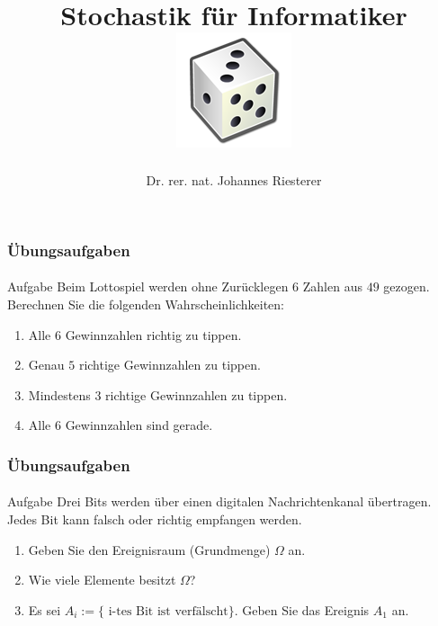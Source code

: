 \documentclass{beamer}
\begin{document}
\title[Stochastik] %
{Stochastik für Informatiker
\\
\includegraphics[scale=0.5]{img/craps}
}
\subtitle{}
\author[Dr. Johannes Riesterer] %
{Dr.  rer. nat. Johannes Riesterer}

\date[KPT 2004] %
{}

\subject{Stochastik}

\frame{\titlepage}

\begin{frame}
    \frametitle{Übungsaufgaben}
\framesubtitle{}
\begin{block}{Aufgabe}
Beim Lottospiel werden ohne Zurücklegen $6$ Zahlen aus $49$ gezogen. Berechnen Sie die folgenden Wahrscheinlichkeiten:
\begin{enumerate}
\item Alle $6$ Gewinnzahlen richtig zu tippen.
\item Genau $5$ richtige Gewinnzahlen zu tippen.
\item Mindestens $3$ richtige Gewinnzahlen zu tippen.
\item Alle $6$ Gewinnzahlen sind gerade.
\end{enumerate}
\end{block}
 \end{frame}



\begin{frame}
    \frametitle{Übungsaufgaben}
\framesubtitle{}
\begin{block}{Aufgabe}
Drei Bits werden über einen digitalen Nachrichtenkanal übertragen. Jedes Bit kann falsch oder richtig empfangen werden.
\begin{enumerate}
\item Geben Sie den Ereignisraum (Grundmenge) $\Omega$ an.
\item Wie viele Elemente besitzt $\Omega$?
\item Es sei $A_i := \{ \text{ i-tes Bit ist verfälscht}\}$. Geben Sie das Ereignis $A_1$ an.
\end{enumerate}
\end{block}

 \end{frame}
\end{document}
